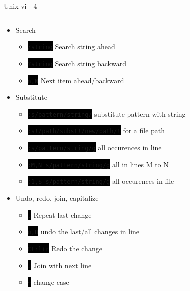 \documentclass[unknownkeysallowed, 10pt, a4 paper, handout]{beamer}
\newcommand{\code}[1]{\colorbox{black}{\color{green}\texttt{#1}}}
\begin{document}
\begin{frame}[label=vim4]{Unix vi - 4}
  \begin{columns}[T]
    \begin{column}{.83\textwidth}
      \begin{itemize}
        \item Search
        \begin{itemize}
          \item \code{/string} Search string ahead
          \item \code{?string} Search string backward
          \item \code{n,N} Next item ahead/backward
        \end{itemize}
        \item Substitute
        \begin{itemize}
           \item \code{:s/pattern/string/} substitute pattern with string
           \item \code{:s!/path/subst!/new/path/!} for a file path
           \item \code{:s/pattern/string/g} all occurences in line
           \item \code{:M,N s/pattern/string/g} all in lines M to N
           \item \code{:1,\$ s/pattern/string/g} all occurences in file
        \end{itemize}
        \item Undo, redo, join, capitalize
        \begin{itemize}
          \item \code{.} Repeat last change
          \item \code{u,U} undo the last/all changes in line
          \item \code{Ctrl+r} Redo the change
          \item \code{J} Join with next line
          \item \code{\~} change case
        \end{itemize}
      \end{itemize}
    \end{column}
    \hfill
    \begin{column}{.25\textwidth}

\end{column}
\end{columns}
\end{frame}
\end{document}
